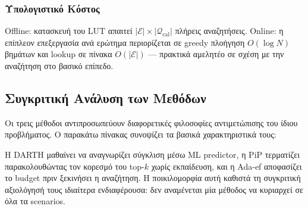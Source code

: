 \documentclass[12pt,a4paper]{article}
\begin{document}
\subsubsection*{Υπολογιστικό Κόστος}
Offline: κατασκευή του LUT απαιτεί $|\mathcal{E}| \times |\mathcal{Q}_{\text{cal}}|$ πλήρεις αναζητήσεις. Online: η επίπλεον επεξεργασία ανά ερώτημα περιορίζεται σε greedy πλοήγηση $O(\log N)$ βημάτων και lookup σε πίνακα $O(|\mathcal{E}|)$ — πρακτικά αμελητέο σε σχέση με την αναζήτηση στο βασικό επίπεδο.

\subsection{Συγκριτική Ανάλυση των Μεθόδων}

Οι τρεις μέθοδοι αντιπροσωπεύουν διαφορετικές φιλοσοφίες αντιμετώπισης του ίδιου προβλήματος. Ο παρακάτω πίνακας συνοψίζει τα βασικά χαρακτηριστικά τους:

\begin{table}[H]
\centering
{}
\caption{Συγκριτική επισκόπηση προσαρμοστικών στρατηγικών. Ο βαθμός αποτελεσματικότητας κάθε μεθόδου εξαρτάται κυρίως από τα χαρακτηριστικά κατανομής του dataset.}
\label{tab:method_comparison}
\end{table}

Η DARTH μαθαίνει να αναγνωρίζει σύγκλιση μέσω ML predictor, η PiP τερματίζει παρακολουθώντας τον κορεσμό του top-$k$ χωρίς εκπαίδευση, και η Ada-ef αποφασίζει το budget πριν ξεκινήσει η αναζήτηση. Η ποικιλομορφία αυτή καθιστά τη συγκριτική αξιολόγησή τους ιδιαίτερα ενδιαφέρουσα: δεν αναμένεται μία μέθοδος να κυριαρχεί σε όλα τα scenarios.
\end{document}

